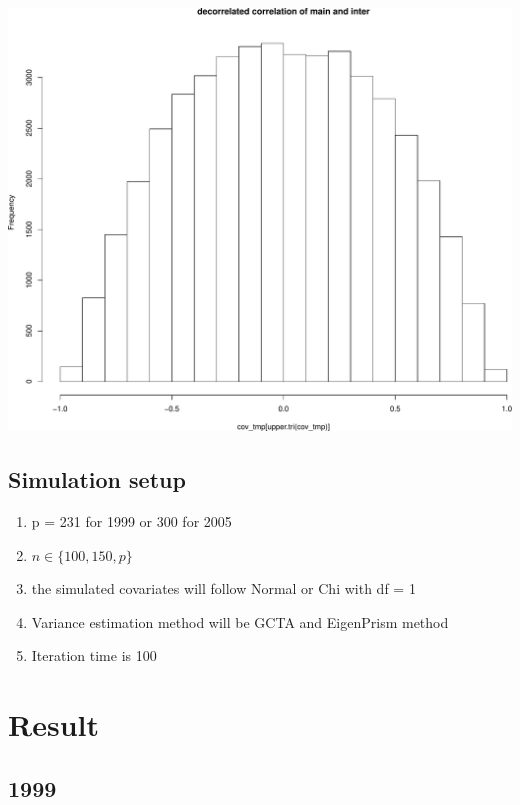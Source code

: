 \documentclass[]{article}
\providecommand{\tightlist}{%
  \setlength{\itemsep}{0pt}\setlength{\parskip}{0pt}}
\begin{document}
\includegraphics{Low_levels_covariance_files/figure-latex/unnamed-chunk-10-1.pdf}

\newpage

\subsection{Simulation setup}\label{simulation-setup}

\begin{enumerate}
\def\labelenumi{\arabic{enumi}.}
\tightlist
\item
  p = 231 for 1999 or 300 for 2005\\
\item
  \(n \in \{100, 150, p\}\)\\
\item
  the simulated covariates will follow Normal or Chi with df = 1\\
\item
  Variance estimation method will be GCTA and EigenPrism method\\
\item
  Iteration time is 100
\end{enumerate}

\section{Result}\label{result}

\subsection{1999}\label{section}
\end{document}
